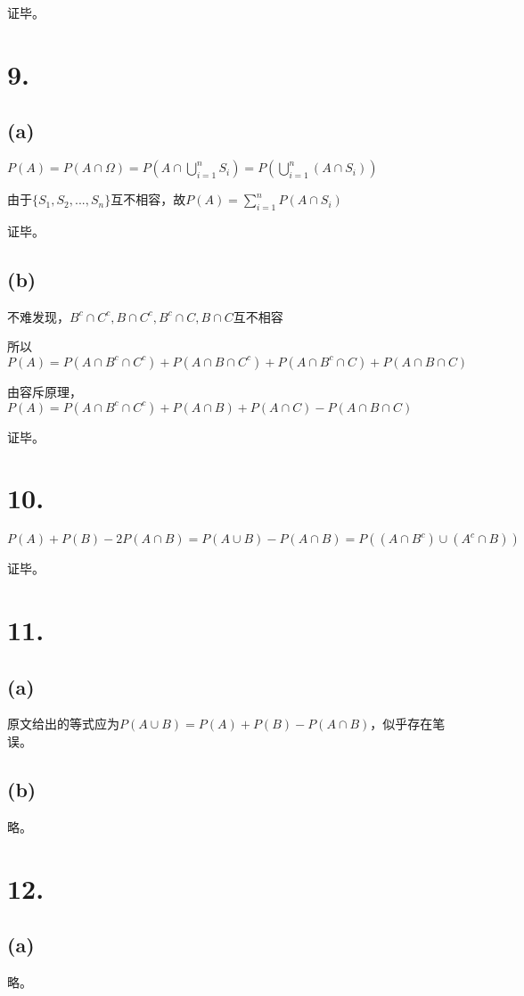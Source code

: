 \documentclass[UTF8]{article}
\begin{document}
        证毕。
    \section*{9.}
        \subsection*{(a)}
            $P(A) = P(A \cap \Omega) = P(A \cap \bigcup_{i = 1}^nS_i) = P(\bigcup_{i = 1}^n(A \cap S_i))$

            由于$\{S_1, S_2, ..., S_n\}$互不相容，故$P(A) = \sum_{i = 1}^nP(A \cap S_i)$

            证毕。
        \subsection*{(b)}
            不难发现，$B^c \cap C^c, B \cap C^c, B^c \cap C, B \cap C$互不相容

            所以$P(A) = P(A \cap B^c \cap C^c) + P(A \cap B \cap C^c) + P(A \cap B^c \cap C) + P(A \cap B \cap C)$

            由容斥原理，$P(A) = P(A \cap B^c \cap C^c) + P(A \cap B) + P(A \cap C) - P(A \cap B \cap C)$

            证毕。
    \section*{10.}
        $P(A) + P(B) - 2P(A \cap B) = P(A \cup B) - P(A \cap B) = P((A \cap B^c) \cup (A^c \cap B))$

        证毕。
    \section*{11.}
        \subsection*{(a)}
            原文给出的等式应为$P(A \cup B) = P(A) + P(B) - P(A \cap B)$，似乎存在笔误。
        \subsection*{(b)}
            略。
    \section*{12.}
        \subsection*{(a)}
            略。
\end{document}
